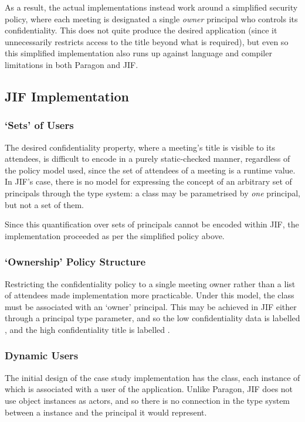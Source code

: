 As a result, the actual implementations instead work around a simplified security policy, where each meeting is designated a single \textit{owner} principal who controls its confidentiality. This does not quite produce the desired application (since it unnecessarily restricts access to the title beyond what is required), but even so this simplified implementation also runs up against language and compiler limitations in both Paragon and JIF.

\subsection{JIF Implementation}

\subsubsection{`Sets' of Users}

The desired confidentiality property, where a meeting's title is visible to its attendees, is difficult to encode in a purely static-checked manner, regardless of the policy model used, since the set of attendees of a meeting is a runtime value. In JIF's case, there is no model for expressing the concept of an arbitrary set of principals through the type system: a class may be parametrised by \textit{one} principal, but not a set of them.

Since this quantification over sets of principals cannot be encoded within JIF, the implementation proceeded as per the simplified policy above.

\subsubsection{`Ownership' Policy Structure}

Restricting the confidentiality policy to a single meeting owner rather than a list of attendees made implementation more practicable. Under this model, the  class must be associated with an `owner' principal. This may be achieved in JIF either through a principal type parameter, and so the low confidentiality data is labelled , and the high confidentiality title is labelled .

\subsubsection{Dynamic Users}

The initial design of the case study implementation has the  class, each instance of which is associated with a user of the application. Unlike Paragon, JIF does not use object instances as actors, and so there is no connection in the type system between a  instance and the principal it would represent.

